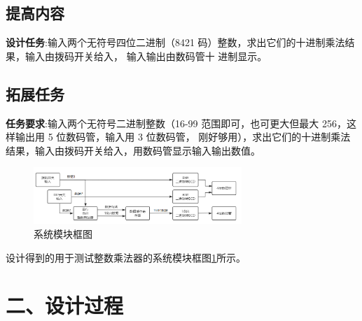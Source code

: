 \documentclass{article}
\newcommand{\fourhao}{\fontsize{14pt}{\baselineskip}\selectfont} %
\newcommand{\xiaosihao}{\fontsize{12pt}{\baselineskip}\selectfont} %
\begin{document}
\subsection*{提高内容}
\textbf{设计任务}:输入两个无符号四位二进制（8421 码）整数，求出它们的十进制乘法结果，输入由拨码开关给入，
输入输出由数码管十
进制显示。\\
\subsection*{拓展任务}
\textbf{任务要求}:输入两个无符号二进制整数（16-99 范围即可，也可更大但最大 256，这样输出用 5 位数码管，输入用 3 位数码管，
刚好够用），求出它们的十进制乘法结果，输入由拨码开关给入，用数码管显示输入输出数值。\\
\begin{figure}[htbp]
    \centering
    \includegraphics[width=0.7\textwidth]{image/2024-06-28-17-32-29.png}
    \caption{系统模块框图}
    \label{image_design_2}
\end{figure}
设计得到的用于测试整数乘法器的系统模块框图\ref{image_design_2}所示。
\section*{\fourhao 二、设计过程}
\xiaosihao
{}
\end{document}
